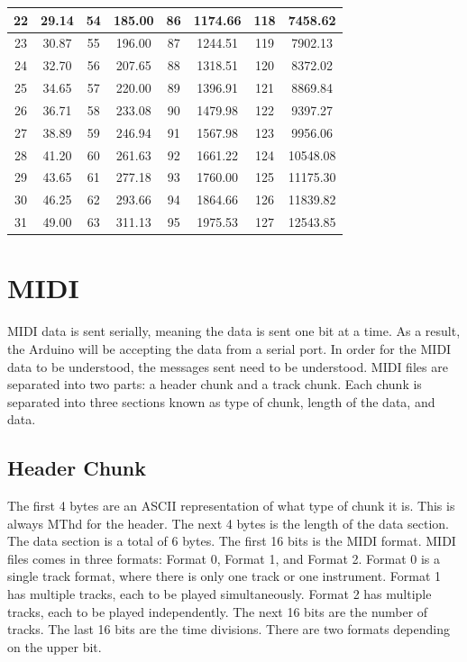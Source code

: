\documentclass[11pt, a4paper]{report}
\begin{document}
\begin{center}
\begin{tabular}{|c|c||c|c||c|c||c|c|}
22 & 29.14 & 54 & 185.00& 86 & 1174.66 & 118 & 7458.62 \\
 \hline
23 & 30.87 & 55 & 196.00& 87 & 1244.51 & 119 & 7902.13 \\
 \hline
24 & 32.70 & 56 & 207.65& 88 & 1318.51 & 120 & 8372.02 \\
 \hline
25 & 34.65 & 57 & 220.00& 89 & 1396.91 & 121 & 8869.84 \\
 \hline
26 & 36.71 & 58 & 233.08& 90 & 1479.98 & 122 & 9397.27 \\
 \hline
27 & 38.89 & 59 & 246.94& 91 & 1567.98 & 123 & 9956.06 \\
 \hline
28 & 41.20 & 60 & 261.63& 92 & 1661.22 & 124 & 10548.08 \\
 \hline
29 & 43.65 & 61 & 277.18& 93 & 1760.00 & 125 & 11175.30 \\
 \hline
30 & 46.25 & 62 & 293.66& 94 & 1864.66 & 126 & 11839.82 \\
 \hline
31 & 49.00 & 63 & 311.13& 95 & 1975.53 & 127 &  12543.85 \\
 \hline
 \end{tabular}
\end{center}


\section{MIDI} \label{MIDIMESSAGE}

MIDI data is sent serially, meaning the data is sent one bit at a time. As a result, the Arduino will be accepting the data from a serial port. In order for the MIDI data to be understood, the messages sent need to be understood. MIDI files are separated into two parts: a header chunk and a track chunk. Each chunk is separated into three sections known as type of chunk, length of the data, and data. 

\subsection{Header Chunk}

The first 4 bytes are an ASCII representation of what type of chunk it is. This is always MThd for the header. The next 4 bytes is the length of the data section. The data section is a total of 6 bytes. The first 16 bits is the MIDI format. MIDI files comes in three formats: Format 0, Format 1, and Format 2. Format 0 is a single track format, where there is only one track or one instrument. Format 1 has multiple tracks, each to be played simultaneously. Format 2 has multiple tracks, each to be played independently. The next 16 bits are the number of tracks. The last 16 bits are the time divisions. There are two formats depending on the upper bit. \\
\end{document}
